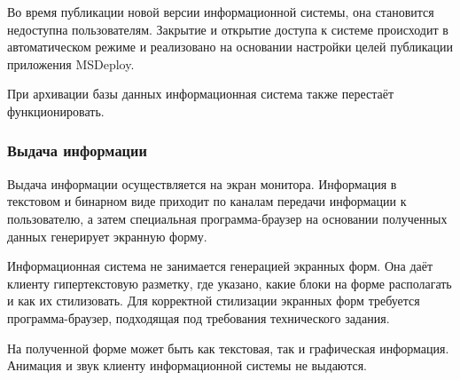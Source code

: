 Во время публикации новой версии информационной системы, она становится недоступна пользователям.
Закрытие и открытие доступа к системе происходит в автоматическом режиме и реализовано на основании настройки целей публикации приложения MSDeploy.

При архивации базы данных информационная система также перестаёт функционировать.

\subsubsection{Выдача информации}

Выдача информации осуществляется на экран монитора.
Информация в текстовом и бинарном виде приходит по каналам передачи информации к пользователю, а затем специальная программа-браузер на основании полученных данных генерирует экранную форму.

Информационная система не занимается генерацией экранных форм.
Она даёт клиенту гипертекстовую разметку, где указано, какие блоки на форме располагать и как их стилизовать.
Для корректной стилизации экранных форм требуется программа-браузер, подходящая под требования технического задания.

На полученной форме может быть как текстовая, так и графическая информация. Анимация и звук клиенту информационной системы не выдаются.

\clearpage
\newpage